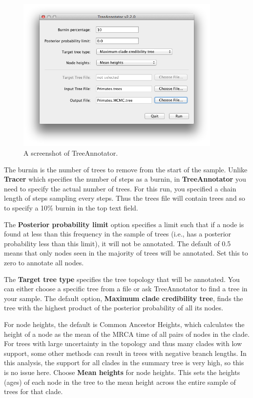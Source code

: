 \documentclass[11pt]{article}
\theoremstyle{plain}%
\theoremstyle{definition}
\theoremstyle{remark}
\begin{document}
\begin{figure}
\centering	
\includegraphics[width=0.9\textwidth]{figures/TreeAnnotator1}
\caption{A screenshot of TreeAnnotator.}
\label{fig:TreeAnnotator1}
\end{figure}

The burnin is the number of trees to remove from the start of the sample. Unlike {\bf Tracer} which specifies the number of
steps as a burnin, in {\bf TreeAnnotator} you need to specify the actual number of trees. For this run, you specified a chain
length of \chainLength{} steps sampling every \logEvery{} steps. Thus the trees file will contain \tracesNumber{} trees and so to specify a 10\% burnin
in the top text field.

The {\bf Posterior probability limit} option specifies a limit such that if a node is found at less than this frequency in the sample
of trees (i.e., has a posterior probability less than this limit), it will not be annotated. The default of 0.5 means that only nodes
seen in the majority of trees will be annotated. Set this to zero to annotate all nodes.

The {\bf Target tree type} specifies the tree topology that will be annotated. You can either choose a specific tree from a file or ask TreeAnnotator to find a tree in your sample.
The default option, {\bf Maximum clade credibility tree}, finds the tree with the highest product of the posterior probability of
all its nodes.

For node heights, the default is Common Ancestor Heights, which calculates
the height of a node as the mean of the MRCA time of all pairs of nodes in
the clade. For trees with large uncertainty in the topology and thus many clades
with low support, some other methods can result in trees with negative branch
lengths. In this analysis, the support for all clades in the summary tree is very
high, so this is no issue here.
Choose {\bf Mean heights} for node heights. This sets the heights (ages) of each node in the tree to the mean height across the
entire sample of trees for that clade.
\end{document}
